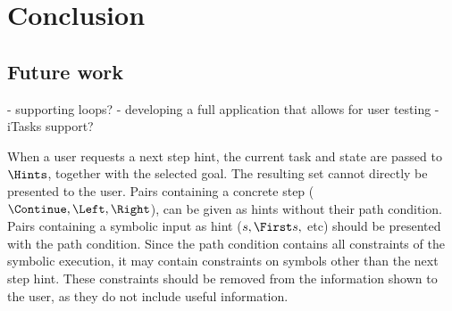 
\section{Conclusion}
\label{sec:conclusion}


\subsection{Future work}


- supporting loops?
- developing a full application that allows for user testing
- iTasks support?

When a user requests a next step hint, the current task and state are passed to $\Hints$, together with the selected goal.
The resulting set cannot directly be presented to the user.
Pairs containing a concrete step ($\Continue,\Left,\Right$), can be given as hints without their path condition.
Pairs containing a symbolic input as hint ($s,\First s,$ etc) should be presented with the path condition.
Since the path condition contains all constraints of the symbolic execution, it may contain constraints on symbols other than the next step hint.
These constraints should be removed from the information shown to the user, as they do not include useful information.
